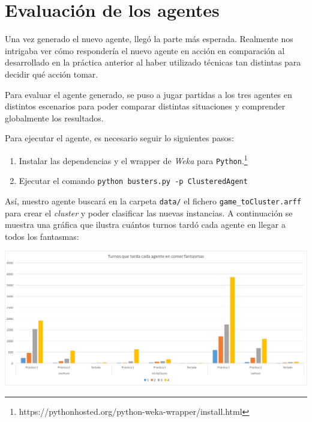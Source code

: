 \documentclass[12pt]{article}
\begin{document}
\newpage
\section{Evaluación de los agentes}


Una vez generado el nuevo agente, llegó la parte más esperada. Realmente nos intrigaba ver cómo respondería el nuevo agente en acción en comparación al desarrollado en la práctica anterior al haber utilizado técnicas tan distintas para decidir qué acción tomar.


Para evaluar el agente generado, se puso a jugar partidas a los tres agentes en distintos escenarios para poder comparar distintas situaciones y comprender globalmente los resultados.

Para ejecutar el agente, es necesario seguir lo siguientes pasos:
\begin{enumerate}
    \item Instalar las dependencias y el wrapper de \textit{Weka} para \texttt{Python}.\footnote{https://pythonhosted.org/python-weka-wrapper/install.html}
    \item Ejecutar el comando \texttt{python busters.py -p ClusteredAgent}
\end{enumerate}

Así, nuestro agente buscará en la carpeta \texttt{data/} el fichero \texttt{game\_toCluster.arff} para crear el \textit{cluster} y poder clasificar las nuevas instancias. A continuación se muestra una gráfica que ilustra cuántos turnos tardó cada agente en llegar a todos los fantasmas:

\begin{center}
    \includegraphics[width=15cm]{performance}
\end{center}
\end{document}
